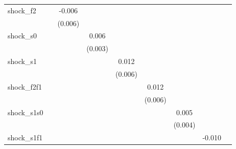 {\begin{tabular}{l*{8}{c}}
\addlinespace
shock\_f2    &                     &      -0.006         &                     &                     &                     &                     &                     &                     \\
            &                     &     (0.006)         &                     &                     &                     &                     &                     &                     \\
\addlinespace
shock\_s0    &                     &                     &       0.006\sym{**} &                     &                     &                     &                     &                     \\
            &                     &                     &     (0.003)         &                     &                     &                     &                     &                     \\
\addlinespace
shock\_s1    &                     &                     &                     &       0.012\sym{*}  &                     &                     &                     &                     \\
            &                     &                     &                     &     (0.006)         &                     &                     &                     &                     \\
\addlinespace
shock\_f2f1  &                     &                     &                     &                     &       0.012\sym{**} &                     &                     &                     \\
            &                     &                     &                     &                     &     (0.006)         &                     &                     &                     \\
\addlinespace
shock\_s1s0  &                     &                     &                     &                     &                     &       0.005         &                     &                     \\
            &                     &                     &                     &                     &                     &     (0.004)         &                     &                     \\
\addlinespace
shock\_s1f1  &                     &                     &                     &                     &                     &                     &      -0.010\sym{*}  &                     \\

\end{tabular}}
